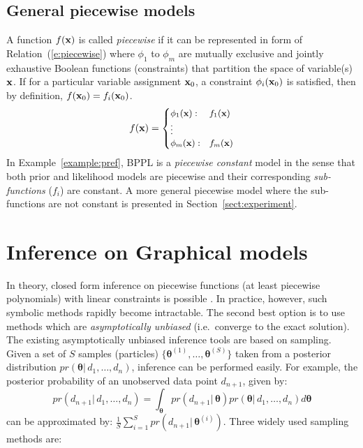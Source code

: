 \subsection{General piecewise models}
A function $f(\textbf{x})$ is called \emph{piecewise} if it can be represented in form of Relation~(\ref{e:piecewise}) where $\phi_1$ to $\phi_m$ are mutually exclusive and jointly exhaustive Boolean functions (constraints) 
that partition the space of variable(s) $\textbf{x}$. If for a particular variable assignment $\textbf{x}_0$, a constraint $\phi_i(\textbf{x}_0)$ is satisfied, then by definition, $f(\textbf{x}_0) = f_i(\textbf{x}_0)$.  
\begin{equation}
\label{e:piecewise}
f(\bvec{x}) = 
{\footnotesize
\begin{cases}
\phi_1(\bvec{x}) : & f_1(\bvec{x})\\
\vdots\\
\phi_m(\bvec{x}) : & f_m(\bvec{x})
\end{cases}
}%
\end{equation}
In Example~\ref{example:pref}, BPPL is a \emph{piecewise constant} model
in the sense that both prior and likelihood models %
are piecewise and their corresponding \emph{sub-functions} ($f_i$) are constant.
A more general piecewise model where the sub-functions are not constant is presented in  Section~\ref{sect:experiment}. 



\section{Inference on Graphical models}
\label{sec:inference}
In theory, closed form inference on piecewise functions (at least piecewise polynomials) with linear constraints is possible \cite{Sanner:12}.
In practice, however, such symbolic methods rapidly become intractable. 
The second best option is to use methods which are \emph{asymptotically unbiased} (i.e.\ converge to the exact solution). The existing asymptotically unbiased inference tools are based on sampling.
Given a set of $S$ samples (particles) $\{\boldsymbol\theta^{(1)}, \ldots, \boldsymbol\theta^{(S)}\}$ taken from a posterior  distribution $pr(\boldsymbol\theta | \, d_1, \ldots, d_n)$, inference can be performed easily. 
For example, the posterior probability of an unobserved data point $d_{n+1}$, given by:
\[
pr(d_{n+1} | \, d_1, \ldots, d_n) = 
\int_{\boldsymbol\theta} pr(d_{n+1} | \, \boldsymbol\theta) pr(\boldsymbol\theta | \, d_1, \ldots, d_n) d\boldsymbol\theta 
\]
can be approximated by: $\frac{1}{S} \sum_{i=1}^S pr(d_{n+1} | \, \boldsymbol\theta^{(i)})$.
Three widely used sampling methods are:

